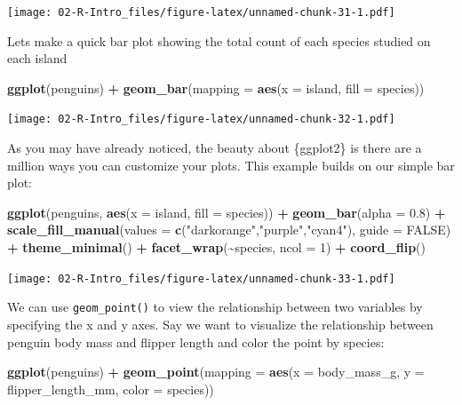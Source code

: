\documentclass[
]{book}
\newenvironment{Shaded}{\begin{snugshade}}{\end{snugshade}}
\newcommand{\AttributeTok}[1]{\textcolor[rgb]{0.13,0.29,0.53}{#1}}
\newcommand{\ConstantTok}[1]{\textcolor[rgb]{0.56,0.35,0.01}{#1}}
\newcommand{\DecValTok}[1]{\textcolor[rgb]{0.00,0.00,0.81}{#1}}
\newcommand{\FloatTok}[1]{\textcolor[rgb]{0.00,0.00,0.81}{#1}}
\newcommand{\FunctionTok}[1]{\textcolor[rgb]{0.13,0.29,0.53}{\textbf{#1}}}
\newcommand{\NormalTok}[1]{#1}
\newcommand{\SpecialCharTok}[1]{\textcolor[rgb]{0.81,0.36,0.00}{\textbf{#1}}}
\newcommand{\StringTok}[1]{\textcolor[rgb]{0.31,0.60,0.02}{#1}}
\begin{document}
\texttt{[image: 02-R-Intro\_files/figure-latex/unnamed-chunk-31-1.pdf]}

Lets make a quick bar plot showing the total count of each species studied on each island

\begin{Shaded}
\begin{Highlighting}[]
\FunctionTok{ggplot}\NormalTok{(penguins) }\SpecialCharTok{+}
  \FunctionTok{geom\_bar}\NormalTok{(}\AttributeTok{mapping =} \FunctionTok{aes}\NormalTok{(}\AttributeTok{x =}\NormalTok{ island, }\AttributeTok{fill =}\NormalTok{ species))}
\end{Highlighting}
\end{Shaded}

\texttt{[image: 02-R-Intro\_files/figure-latex/unnamed-chunk-32-1.pdf]}

As you may have already noticed, the beauty about \{ggplot2\} is there are a million ways you can customize your plots. This example builds on our simple bar plot:

\begin{Shaded}
\begin{Highlighting}[]
\FunctionTok{ggplot}\NormalTok{(penguins, }\FunctionTok{aes}\NormalTok{(}\AttributeTok{x =}\NormalTok{ island, }\AttributeTok{fill =}\NormalTok{ species)) }\SpecialCharTok{+}
  \FunctionTok{geom\_bar}\NormalTok{(}\AttributeTok{alpha =} \FloatTok{0.8}\NormalTok{) }\SpecialCharTok{+}
  \FunctionTok{scale\_fill\_manual}\NormalTok{(}\AttributeTok{values =} \FunctionTok{c}\NormalTok{(}\StringTok{"darkorange"}\NormalTok{,}\StringTok{"purple"}\NormalTok{,}\StringTok{"cyan4"}\NormalTok{), }
                    \AttributeTok{guide =} \ConstantTok{FALSE}\NormalTok{) }\SpecialCharTok{+}
  \FunctionTok{theme\_minimal}\NormalTok{() }\SpecialCharTok{+}
  \FunctionTok{facet\_wrap}\NormalTok{(}\SpecialCharTok{\textasciitilde{}}\NormalTok{species, }\AttributeTok{ncol =} \DecValTok{1}\NormalTok{) }\SpecialCharTok{+}
  \FunctionTok{coord\_flip}\NormalTok{()}
\end{Highlighting}
\end{Shaded}

\texttt{[image: 02-R-Intro\_files/figure-latex/unnamed-chunk-33-1.pdf]}

We can use \texttt{geom\_point()} to view the relationship between two variables by specifying the x and y axes. Say we want to visualize the relationship between penguin body mass and flipper length and color the point by species:

\begin{Shaded}
\begin{Highlighting}[]
\FunctionTok{ggplot}\NormalTok{(penguins) }\SpecialCharTok{+}
  \FunctionTok{geom\_point}\NormalTok{(}\AttributeTok{mapping =} \FunctionTok{aes}\NormalTok{(}\AttributeTok{x =}\NormalTok{ body\_mass\_g, }\AttributeTok{y =}\NormalTok{ flipper\_length\_mm, }\AttributeTok{color =}\NormalTok{ species))}
\end{Highlighting}
\end{Shaded}
\end{document}

